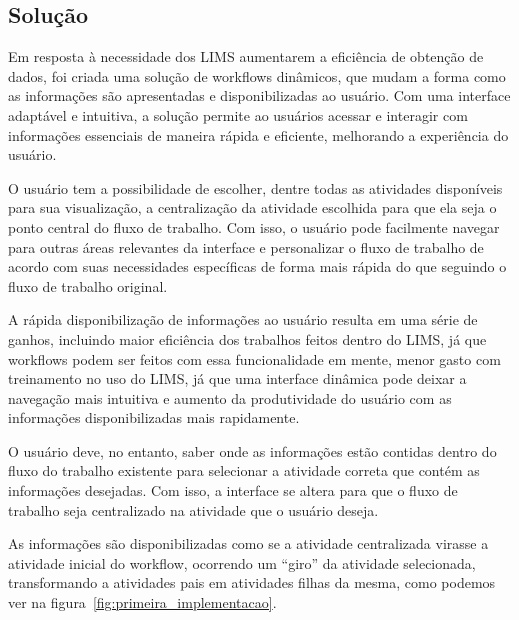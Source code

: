 \subsection{Solução}

Em resposta à necessidade dos LIMS aumentarem a eficiência de obtenção de dados, foi criada uma solução de workflows dinâmicos, que mudam a forma como as informações são apresentadas e disponibilizadas ao usuário.
Com uma interface adaptável e intuitiva, a solução permite ao usuários acessar e interagir com informações essenciais de maneira rápida e eficiente, melhorando a experiência do usuário.

O usuário tem a possibilidade de escolher, dentre todas as atividades disponíveis para sua visualização, a centralização da atividade escolhida para que ela seja o ponto central do fluxo de trabalho. Com isso, o usuário pode facilmente navegar para outras áreas relevantes da interface e personalizar o fluxo de trabalho de acordo com suas necessidades específicas de forma mais rápida do que seguindo o fluxo de trabalho original.

A rápida disponibilização de informações ao usuário resulta em uma série de ganhos, incluindo maior eficiência dos trabalhos feitos dentro do LIMS, já que workflows podem ser feitos com essa funcionalidade em mente, menor gasto com treinamento no uso do LIMS, já que uma interface dinâmica pode deixar a navegação mais intuitiva e aumento da produtividade do usuário com as informações disponibilizadas mais rapidamente.

O usuário deve, no entanto, saber onde as informações estão contidas dentro do fluxo do trabalho existente para selecionar a atividade correta que contém as informações desejadas. Com isso, a interface se altera para que o fluxo de trabalho seja centralizado na atividade que o usuário deseja.

As informações são disponibilizadas como se a atividade centralizada virasse a atividade inicial do workflow, ocorrendo um ``giro'' da atividade selecionada, transformando a atividades pais em atividades filhas da mesma, como podemos ver na figura~\ref{fig:primeira_implementacao}.

